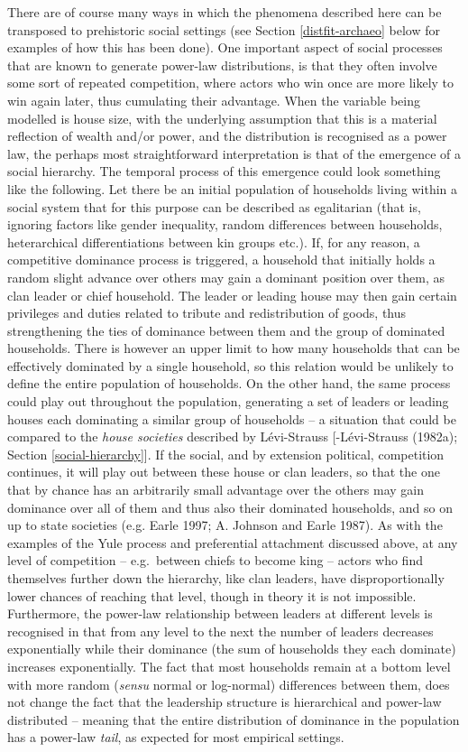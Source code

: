 \documentclass[
  12pt,
  a4paper, twoside]{book}
\begin{document}
There are of course many ways in which the phenomena described here can be transposed to prehistoric social settings (see Section \ref{distfit-archaeo} below for examples of how this has been done). One important aspect of social processes that are known to generate power-law distributions, is that they often involve some sort of repeated competition, where actors who win once are more likely to win again later, thus cumulating their advantage. When the variable being modelled is house size, with the underlying assumption that this is a material reflection of wealth and/or power, and the distribution is recognised as a power law, the perhaps most straightforward interpretation is that of the emergence of a social hierarchy. The temporal process of this emergence could look something like the following. Let there be an initial population of households living within a social system that for this purpose can be described as egalitarian (that is, ignoring factors like gender inequality, random differences between households, heterarchical differentiations between kin groups etc.). If, for any reason, a competitive dominance process is triggered, a household that initially holds a random slight advance over others may gain a dominant position over them, as clan leader or chief household. The leader or leading house may then gain certain privileges and duties related to tribute and redistribution of goods, thus strengthening the ties of dominance between them and the group of dominated households. There is however an upper limit to how many households that can be effectively dominated by a single household, so this relation would be unlikely to define the entire population of households. On the other hand, the same process could play out throughout the population, generating a set of leaders or leading houses each dominating a similar group of households -- a situation that could be compared to the \emph{house societies} described by Lévi-Strauss {[}-Lévi-Strauss (1982a); Section \ref{social-hierarchy}{]}. If the social, and by extension political, competition continues, it will play out between these house or clan leaders, so that the one that by chance has an arbitrarily small advantage over the others may gain dominance over all of them and thus also their dominated households, and so on up to state societies (e.g. Earle 1997; A. Johnson and Earle 1987). As with the examples of the Yule process and preferential attachment discussed above, at any level of competition -- e.g.~between chiefs to become king -- actors who find themselves further down the hierarchy, like clan leaders, have disproportionally lower chances of reaching that level, though in theory it is not impossible. Furthermore, the power-law relationship between leaders at different levels is recognised in that from any level to the next the number of leaders decreases exponentially while their dominance (the sum of households they each dominate) increases exponentially. The fact that most households remain at a bottom level with more random (\emph{sensu} normal or log-normal) differences between them, does not change the fact that the leadership structure is hierarchical and power-law distributed -- meaning that the entire distribution of dominance in the population has a power-law \emph{tail}, as expected for most empirical settings.
\end{document}
